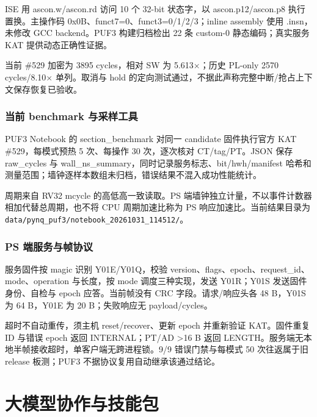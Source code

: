 ISE 用 ascon.w/ascon.rd 访问 10 个 32-bit 状态字，以 ascon.p12/ascon.p8 执行置换。主操作码 0x0B、funct7=0、funct3=0/1/2/3；inline assembly 使用 .insn，未修改 GCC backend。PUF3 构建归档检出 22 条 custom-0 静态编码；真实服务 KAT 提供动态正确性证据。

当前 \#529 加密为 3895 cycles，相对 SW 为 5.613$\times$；历史 PL-only 2570 cycles/8.10$\times$ 单列。取消与 hold 的定向测试通过，不据此声称完整中断/抢占上下文保存恢复已验收。

\Needspace{85pt}

\subsubsection{当前 benchmark 与采样工具}\label{ux5f53ux524d-benchmark-ux4e0eux91c7ux6837ux5de5ux5177}

PUF3 Notebook 的 section\_benchmark 对同一 candidate 固件执行官方 KAT \#529，每模式预热 5 次、每操作 30 次，逐次核对 CT/tag/PT。JSON 保存 raw\_cycles 与 wall\_ns\_summary，同时记录服务标志、bit/hwh/manifest 哈希和测量范围；墙钟逐样本数组未归档，错误结果不混入成功性能统计。

周期来自 RV32 mcycle 的高低高一致读取。PS 端墙钟独立计量，不以事件计数器相加代替总周期，也不将 CPU 周期加速比称为 PS 响应加速比。当前结果目录为 \texttt{data/pynq\_puf3/notebook\_20261031\_114512/}。

\Needspace{85pt}

\subsubsection{PS 端服务与帧协议}\label{ps-ux7aefux670dux52a1ux4e0eux5e27ux534fux8bae}

服务固件按 magic 识别 Y01E/Y01Q，校验 version、flags、epoch、request\_id、mode、operation 与长度，按 mode 调度三种实现，发送 Y01R；Y01S 发送固件身份、自检与 epoch 应答。当前帧没有 CRC 字段。请求/响应头各 48 B，Y01S 为 64 B，Y01E 为 20 B；失败响应无 payload/cycles。

超时不自动重传，须主机 reset/recover、更新 epoch 并重新验证 KAT。固件重复 ID 与错误 epoch 返回 INTERNAL；PT/AD \textgreater16 B 返回 LENGTH。服务端无本地半帧接收超时，单客户端无跨进程锁。9/9 错误门禁与每模式 50 次往返属于旧 release 板测；PUF3 不据协议复用自动继承该通过结论。

\Needspace{85pt}

\section{大模型协作与技能包}

